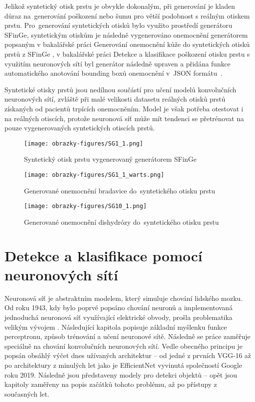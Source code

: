 Jelikož syntetický otisk prstu je obvykle dokonalým, při generování je kladen důraz na~generování poškození nebo šumu pro větší podobnost s reálným otiskem prstu. Pro~generování syntetických otisků bylo využito prostředí generátoru SFinGe, syntetickým otiskům je následně vygenerováno onemocnění generátorem popsaným v bakalářské práci Generování onemocnění kůže do syntetických otisků prstů z
SFinGe \cite{FITBT21893}, v bakalářské práci Detekce a klasifikace poškození otisku prstu s využitím neuronových sítí byl generátor následně upraven a přidána funkce automatického anotování bounding boxů onemocnění v~JSON formátu~\cite{FITBT22567}.

Syntetické otisky prstů jsou nedílnou součástí pro učení modelů konvolučních neuronových sítí, zvláště při malé velikosti datasetu reálných otisků prstů získaných od pacientů trpících onemocněním. Model je však potřeba otestovat i na reálných otiscích, protože neuronová síť může mít tendenci se přetrénovat na pouze vygenerovaných syntetických otiscích prstů.

\begin{figure}[!htbp]
  \begin{minipage}[b]{0.3\linewidth}
    \centering
    \texttt{[image: obrazky-figures/SG1\_1.png]}
    \caption{Syntetický otisk prstu vygenerovaný generátorem SFinGe}
  \end{minipage}
  \hspace{0.5cm}
  \begin{minipage}[b]{0.3\linewidth}
    \centering
    \texttt{[image: obrazky-figures/SG1\_1\_warts.png]}
    \caption{Generované onemocnění bradavice do~syntetického otisku prstu}
  \end{minipage}
  \hspace{0.5cm}
  \begin{minipage}[b]{0.3\linewidth}
    \centering
    \texttt{[image: obrazky-figures/SG10\_1.png]}
    \caption{Generované onemocnění dishydrózy do~syntetického otisku prstu}
  \end{minipage}
\end{figure}

\chapter{Detekce a klasifikace pomocí neuronových sítí}
Neuronová síť je abstraktním modelem, který simuluje chování lidského mozku. Od roku 1943, kdy bylo poprvé popsáno chování neuronů a implementovaná jednoduchá neuronová síť využívající elektrické obvody, prošla problematika velikým vývojem \cite{ANNHistory}. Následující kapitola popisuje základní myšlenku funkce perceptronu, způsob trénování a učení neuronové sítě. Následně se práce zaměřuje speciálně na chování konvolučních neuronových sítí. Vedle obecného principu je popsán obsáhlý výčet dnes užívaných architektur -- od jedné z prvních VGG-16 až po architektury z minulých let jako je EfficientNet vyvinutá společností Google roku 2019. Následně jsou představeny modely pro detekci objektů -- opět jsou kapitoly zaměřeny na popis začátků tohoto problému, až po přístupy z současných let.
